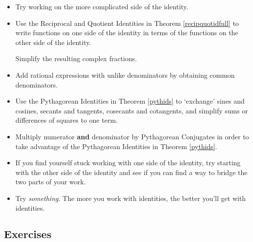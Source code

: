 \documentclass{ximera}
\begin{document}
\begin{itemize}

\item  Try working on the more complicated side of the identity.

\item Use the Reciprocal and Quotient Identities in Theorem \ref{recipquotidfull} to write functions on one side of the identity in terms of the functions on the other side of the identity.  

\smallskip

Simplify the resulting complex fractions.

\item Add rational expressions with unlike denominators by obtaining common denominators.

\item  Use the Pythagorean Identities in Theorem \ref{pythids} to `exchange' sines and cosines, secants and tangents, cosecants and cotangents, and simplify sums or differences of squares to one term. 

\item Multiply numerator \textbf{and} denominator by Pythagorean
Conjugates in order to take advantage of the Pythagorean Identities in  Theorem \ref{pythids}.

\item If you find yourself stuck working with one side of the identity, try starting with the other side of the identity and see if you can find a way to bridge the two parts of your work.

\item  Try \textit{something}.  The more you work with identities, the better you'll get with identities.

\smallskip


\end{itemize}


\newpage

\subsection{Exercises}



\closegraphsfile
\end{document}

